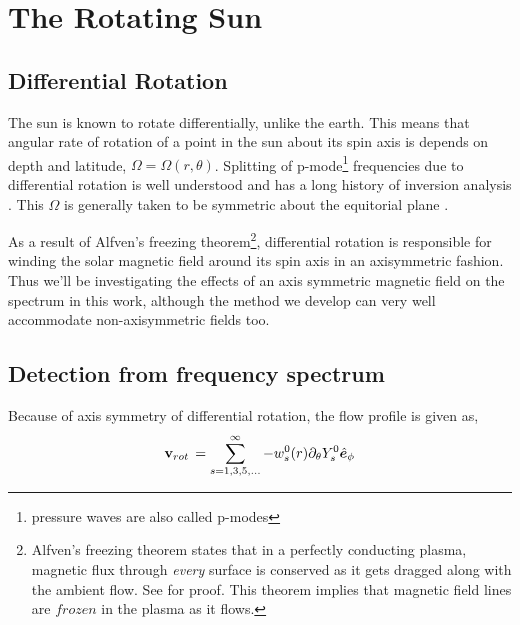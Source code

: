 
\chapter{The Rotating Sun}

\section{Differential Rotation}
The sun is known to rotate differentially, unlike the earth. This means that angular rate of rotation of a point in the sun about its spin axis is depends on depth and latitude, $\Omega = \Omega(r,\theta)$. Splitting of p-mode\footnote{pressure waves are also called p-modes} frequencies due to differential rotation is well understood and has a long history of inversion analysis \cite{ritzwoller,lavely92,schou98}.
This $\Omega$ is generally taken to be symmetric about the equitorial plane \cite{ritzwoller}.

As a result of Alfven's freezing theorem\footnote{Alfven's freezing theorem states that in a perfectly conducting plasma, magnetic flux through \textit{every} surface is conserved as it gets dragged along with the ambient flow. See \cite{goedbloed2004} for proof. This theorem implies that magnetic field lines are $frozen$ in the plasma as it flows.}, differential rotation is responsible for winding the solar magnetic field around its spin axis in an axisymmetric fashion. Thus we'll be investigating the effects of an axis symmetric magnetic field on the spectrum in this work, although the method we develop can very well accommodate non-axisymmetric fields too.
\section{Detection from frequency spectrum}
Because of axis symmetry of differential rotation, the flow profile is given as,
\begin{equation}
\mathbf{v}_{rot}\, = \sum_{s = 1,3,5,...}^{\infty} -w_s^0(r) \partial_{\theta} Y_s^0 \hat{\bm{e}}_{\phi}
\end{equation}

